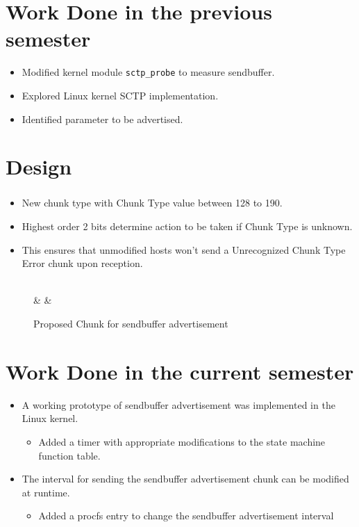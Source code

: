 \documentclass{beamer}
\begin{document}
\section{Work Done in the previous semester}
\begin{frame}{\insertsection}
\begin{itemize}
\item Modified kernel module \texttt{sctp\_probe} to measure sendbuffer.
\item Explored Linux kernel SCTP implementation.
\item Identified parameter to be advertised.
\end{itemize}
\end{frame}

\section{Design}
\begin{frame}[fragile]
\frametitle{\insertsection}
\begin{itemize}
\item New chunk type with Chunk Type value between 128 to 190.
\item Highest order 2 bits determine action to be taken if Chunk Type is
	unknown.
\item This ensures that unmodified hosts won't send a
	Unrecognized Chunk Type Error chunk upon reception.
\end{itemize}

\begin{figure}[h]
	\centering
	\begin{bytefield}{32}
	\\
	 &  & \\
	\end{bytefield}
	\caption{Proposed Chunk for sendbuffer advertisement}
\end{figure}
\end{frame}

\section{Work Done in the current semester}
\begin{frame}{\insertsection}
\begin{itemize}
\item A working prototype of sendbuffer advertisement was implemented in the Linux kernel.
\begin{itemize}
	\item Added a timer with appropriate modifications to the state machine function table.
\end{itemize}
	\item The interval for sending the sendbuffer advertisement chunk can be modified at runtime.
\begin{itemize}
	\item Added a procfs entry to change the sendbuffer advertisement interval
\end{itemize}
\end{itemize}
\end{frame}
\end{document}
